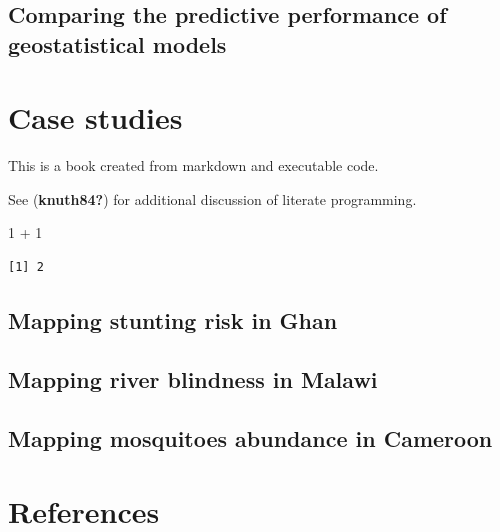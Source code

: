 \documentclass[
  letterpaper,
]{krantz}
\newenvironment{Shaded}{\begin{snugshade}}{\end{snugshade}}
\newcommand{\DecValTok}[1]{\textcolor[rgb]{0.68,0.00,0.00}{#1}}
\newcommand{\SpecialCharTok}[1]{\textcolor[rgb]{0.37,0.37,0.37}{#1}}
\begin{document}
\hypertarget{comparing-the-predictive-performance-of-geostatistical-models}{%
\section{Comparing the predictive performance of geostatistical
models}\label{comparing-the-predictive-performance-of-geostatistical-models}}


\hypertarget{sec-case-studies}{%
\chapter{Case studies}\label{sec-case-studies}}

This is a book created from markdown and executable code.

See (\textbf{knuth84?}) for additional discussion of literate
programming.

\begin{Shaded}
\begin{Highlighting}[]
\DecValTok{1} \SpecialCharTok{+} \DecValTok{1}
\end{Highlighting}
\end{Shaded}

\begin{verbatim}
[1] 2
\end{verbatim}

\hypertarget{mapping-stunting-risk-in-ghan}{%
\section{Mapping stunting risk in
Ghan}\label{mapping-stunting-risk-in-ghan}}

\hypertarget{mapping-river-blindness-in-malawi}{%
\section{Mapping river blindness in
Malawi}\label{mapping-river-blindness-in-malawi}}

\hypertarget{mapping-mosquitoes-abundance-in-cameroon}{%
\section{Mapping mosquitoes abundance in
Cameroon}\label{mapping-mosquitoes-abundance-in-cameroon}}


\hypertarget{references}{%
\chapter*{References}\label{references}}
\end{document}
